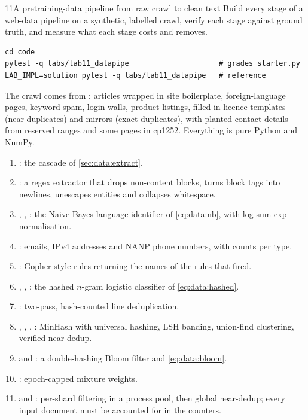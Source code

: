 \begin{labbox}{11}{A pretraining-data pipeline from raw crawl to clean text}
Build every stage of a web-data pipeline on a synthetic, labelled crawl, verify each stage
against ground truth, and measure what each stage costs and removes.

\begin{lstlisting}[style=shell]
cd code
pytest -q labs/lab11_datapipe                     # grades starter.py
LAB_IMPL=solution pytest -q labs/lab11_datapipe   # reference
\end{lstlisting}
The crawl comes from : articles wrapped in site boilerplate, foreign-language
pages, keyword spam, login walls, product listings, filled-in licence templates (near duplicates)
and mirrors (exact duplicates), with planted contact details from reserved ranges and some pages in
cp1252. Everything is pure Python and NumPy.

\begin{enumerate}
  \item {}: the cascade of \cref{sec:data:extract}.
  \item {}: a regex extractor that drops non-content blocks, turns block tags into
        newlines, unescapes entities and collapses whitespace.
  \item {}, , : the Naive Bayes
        language identifier of \cref{eq:data:nb}, with log-sum-exp normalisation.
  \item {}: emails, IPv4 addresses and NANP phone numbers, with counts per type.
  \item {}: Gopher-style rules returning the names of the rules that fired.
  \item {}, , : the hashed $n$-gram
        logistic classifier of \cref{eq:data:hashed}.
  \item {}: two-pass, hash-counted line deduplication.
  \item {}, , , :
        MinHash with universal hashing, LSH banding, union-find clustering, verified near-dedup.
  \item {} and : a double-hashing Bloom filter and \cref{eq:data:bloom}.
  \item {}: epoch-capped mixture weights.
  \item {} and : per-shard filtering in a process pool,
        then global near-dedup; every input document must be accounted for in the counters.
\end{enumerate}


\end{labbox}
